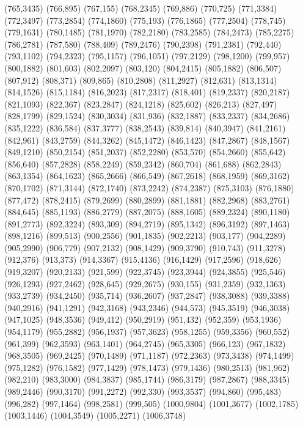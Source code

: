 (765,3435)
(766,895)
(767,155)
(768,2345)
(769,886)
(770,725)
(771,3384)
(772,3497)
(773,2854)
(774,1860)
(775,193)
(776,1865)
(777,2504)
(778,745)
(779,1631)
(780,1485)
(781,1970)
(782,2180)
(783,2585)
(784,2473)
(785,2275)
(786,2781)
(787,580)
(788,409)
(789,2476)
(790,2398)
(791,2381)
(792,440)
(793,1102)
(794,2323)
(795,1157)
(796,1051)
(797,2129)
(798,1200)
(799,957)
(800,1882)
(801,603)
(802,2097)
(803,120)
(804,2415)
(805,1882)
(806,507)
(807,912)
(808,371)
(809,865)
(810,2808)
(811,2927)
(812,631)
(813,1314)
(814,1526)
(815,1184)
(816,2023)
(817,2317)
(818,401)
(819,2337)
(820,2187)
(821,1093)
(822,367)
(823,2847)
(824,1218)
(825,602)
(826,213)
(827,497)
(828,1799)
(829,1524)
(830,3034)
(831,936)
(832,1887)
(833,2337)
(834,2686)
(835,1222)
(836,584)
(837,3777)
(838,2543)
(839,814)
(840,3947)
(841,2161)
(842,961)
(843,2759)
(844,3262)
(845,1472)
(846,1423)
(847,2867)
(848,1567)
(849,1210)
(850,2154)
(851,2037)
(852,2280)
(853,570)
(854,2660)
(855,642)
(856,640)
(857,2828)
(858,2249)
(859,2342)
(860,704)
(861,688)
(862,2843)
(863,1354)
(864,1623)
(865,2666)
(866,549)
(867,2618)
(868,1959)
(869,3162)
(870,1702)
(871,3144)
(872,1740)
(873,2242)
(874,2387)
(875,3103)
(876,1880)
(877,472)
(878,2415)
(879,2699)
(880,2899)
(881,1881)
(882,2968)
(883,2761)
(884,645)
(885,1193)
(886,2779)
(887,2075)
(888,1605)
(889,2324)
(890,1180)
(891,2773)
(892,3224)
(893,309)
(894,2719)
(895,1342)
(896,3192)
(897,1463)
(898,1216)
(899,513)
(900,2556)
(901,1835)
(902,2213)
(903,177)
(904,2289)
(905,2990)
(906,779)
(907,2132)
(908,1429)
(909,3790)
(910,743)
(911,3278)
(912,376)
(913,373)
(914,3367)
(915,4136)
(916,1429)
(917,2596)
(918,626)
(919,3207)
(920,2133)
(921,599)
(922,3745)
(923,3944)
(924,3855)
(925,546)
(926,1293)
(927,2462)
(928,645)
(929,2675)
(930,155)
(931,2359)
(932,1363)
(933,2739)
(934,2450)
(935,714)
(936,2607)
(937,2847)
(938,3088)
(939,3388)
(940,2916)
(941,1291)
(942,3168)
(943,2346)
(944,573)
(945,3519)
(946,3038)
(947,1025)
(948,3536)
(949,412)
(950,2919)
(951,432)
(952,359)
(953,1936)
(954,1179)
(955,2882)
(956,1937)
(957,3623)
(958,1255)
(959,3356)
(960,552)
(961,399)
(962,3593)
(963,1401)
(964,2745)
(965,3305)
(966,123)
(967,1832)
(968,3505)
(969,2425)
(970,1489)
(971,1187)
(972,2363)
(973,3438)
(974,1499)
(975,1282)
(976,1582)
(977,1429)
(978,1473)
(979,1436)
(980,2513)
(981,962)
(982,210)
(983,3000)
(984,3837)
(985,1744)
(986,3179)
(987,2867)
(988,3345)
(989,2446)
(990,3170)
(991,2272)
(992,330)
(993,3537)
(994,860)
(995,483)
(996,282)
(997,1464)
(998,2581)
(999,505)
(1000,9804)
(1001,3677)
(1002,1785)
(1003,1446)
(1004,3549)
(1005,2271)
(1006,3748)
